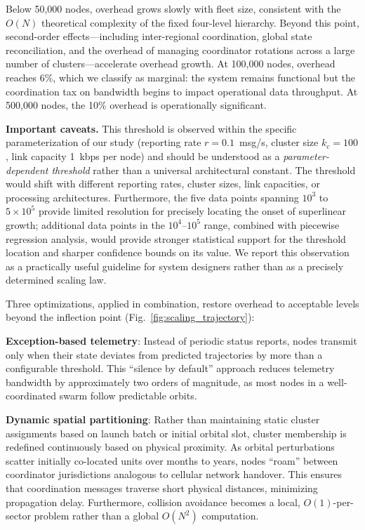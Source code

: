\documentclass[journal]{IEEEtran}
\begin{document}
Below 50{,}000 nodes, overhead grows slowly with fleet size, consistent with the $O(N)$ theoretical complexity of the fixed four-level hierarchy. Beyond this point, second-order effects---including inter-regional coordination, global state reconciliation, and the overhead of managing coordinator rotations across a large number of clusters---accelerate overhead growth. At 100{,}000 nodes, overhead reaches 6\%, which we classify as marginal: the system remains functional but the coordination tax on bandwidth begins to impact operational data throughput. At 500{,}000 nodes, the 10\% overhead is operationally significant.

\textbf{Important caveats.} This threshold is observed within the specific parameterization of our study (reporting rate $r = 0.1$~msg/s, cluster size $k_c = 100$, link capacity 1~kbps per node) and should be understood as a \emph{parameter-dependent threshold} rather than a universal architectural constant. The threshold would shift with different reporting rates, cluster sizes, link capacities, or processing architectures. Furthermore, the five data points spanning $10^3$ to $5 \times 10^5$ provide limited resolution for precisely locating the onset of superlinear growth; additional data points in the $10^4$--$10^5$ range, combined with piecewise regression analysis, would provide stronger statistical support for the threshold location and sharper confidence bounds on its value. We report this observation as a practically useful guideline for system designers rather than as a precisely determined scaling law.

Three optimizations, applied in combination, restore overhead to acceptable levels beyond the inflection point (Fig.~\ref{fig:scaling_trajectory}):

\textbf{Exception-based telemetry}: Instead of periodic status reports, nodes transmit only when their state deviates from predicted trajectories by more than a configurable threshold. This ``silence by default'' approach reduces telemetry bandwidth by approximately two orders of magnitude, as most nodes in a well-coordinated swarm follow predictable orbits.

\textbf{Dynamic spatial partitioning}: Rather than maintaining static cluster assignments based on launch batch or initial orbital slot, cluster membership is redefined continuously based on physical proximity. As orbital perturbations scatter initially co-located units over months to years, nodes ``roam'' between coordinator jurisdictions analogous to cellular network handover. This ensures that coordination messages traverse short physical distances, minimizing propagation delay. Furthermore, collision avoidance becomes a local, $O(1)$-per-sector problem rather than a global $O(N^2)$ computation.
\end{document}

